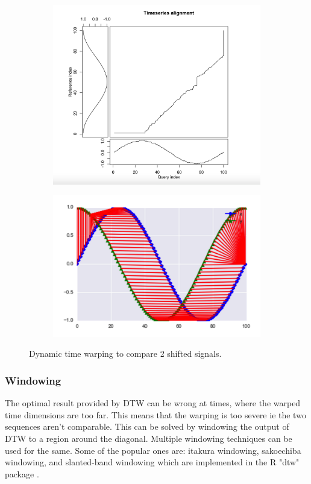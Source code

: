 \documentclass[hidelinks,BTech]{iitmdiss}
\begin{document}
\begin{figure}[H]
  \centering
  \begin{subfigure}[t]{0.48\textwidth}
    \centering
      \includegraphics[width=\textwidth]{DTW.png}
  \end{subfigure}
  \quad
  \begin{subfigure}[t]{0.48\textwidth}
    \centering
      \includegraphics[width=\textwidth]{DTW2.png}
  \end{subfigure}
  \caption{Dynamic time warping to compare 2 shifted signals.}
\end{figure}

\subsubsection{Windowing}
The optimal result provided by DTW can be wrong at times, where the warped time dimensions are too far. This means that the warping is too severe ie the two sequences aren't comparable. This can be solved by windowing the output of DTW to a region around the diagonal. Multiple windowing techniques can be used for the same. Some of the popular ones are: itakura windowing, sakoechiba windowing, and slanted-band windowing which are implemented in the R "dtw" package \cite{RDTWPackage}. 
\end{document}
